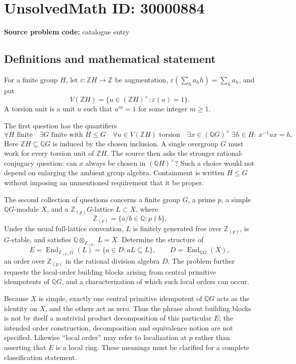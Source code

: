 \documentclass[11pt]{article}
\newcommand{\Z}{\mathbb{Z}}
\newcommand{\Q}{\mathbb{Q}}
\begin{document}
\section*{UnsolvedMath ID: 30000884}
\textbf{Source problem code:} catalogue entry
\subsection{Definitions and mathematical statement}
For a finite group $H$, let $\varepsilon:\Z H\to\Z$ be augmentation, $\varepsilon(\sum_h a_hh)=\sum_h a_h$, and put
\[
V(\Z H)=\{u\in(\Z H)^\times:\varepsilon(u)=1\}.
\]
A torsion unit is a unit $u$ such that $u^m=1$ for some integer $m\geq1$.

The first question has the quantifiers
\[
\forall H\text{ finite}\quad\exists G\text{ finite with }H\leq G\quad
\forall u\in V(\Z H)\text{ torsion}\quad
\exists x\in(\Q G)^\times\ \exists h\in H:\ x^{-1}ux=h.
\]
Here $\Z H\subseteq\Q G$ is induced by the chosen inclusion. A single overgroup $G$ must work for every torsion unit of $\Z H$. The source then asks the stronger rational-conjugacy question: can $x$ always be chosen in $(\Q H)^\times$? Such a choice would not depend on enlarging the ambient group algebra. Containment is written $H\leq G$ without imposing an unmentioned requirement that it be proper.

The second collection of questions concerns a finite group $G$, a prime $p$, a simple $\Q G$-module $X$, and a $\Z_{(p)}G$-lattice $L\subset X$, where
\[
\Z_{(p)}=\{a/b\in\Q:p\nmid b\}.
\]
Under the usual full-lattice convention, $L$ is finitely generated free over $\Z_{(p)}$, is $G$-stable, and satisfies $\Q\otimes_{\Z_{(p)}}L=X$. Determine the structure of
\[
E=\operatorname{End}_{\Z_{(p)}G}(L)
=\{a\in D:aL\subseteq L\},\qquad D=\operatorname{End}_{\Q G}(X),
\]
an order over $\Z_{(p)}$ in the rational division algebra $D$. The problem further requests the local-order building blocks arising from central primitive idempotents of $\Q G$, and a characterization of which such local orders can occur.

Because $X$ is simple, exactly one central primitive idempotent of $\Q G$ acts as the identity on $X$, and the others act as zero. Thus the phrase about building blocks is not by itself a nontrivial product decomposition of this particular $E$; the intended order construction, decomposition and equivalence notion are not specified. Likewise ``local order'' may refer to localization at $p$ rather than asserting that $E$ is a local ring. These meanings must be clarified for a complete classification statement.
\end{document}
